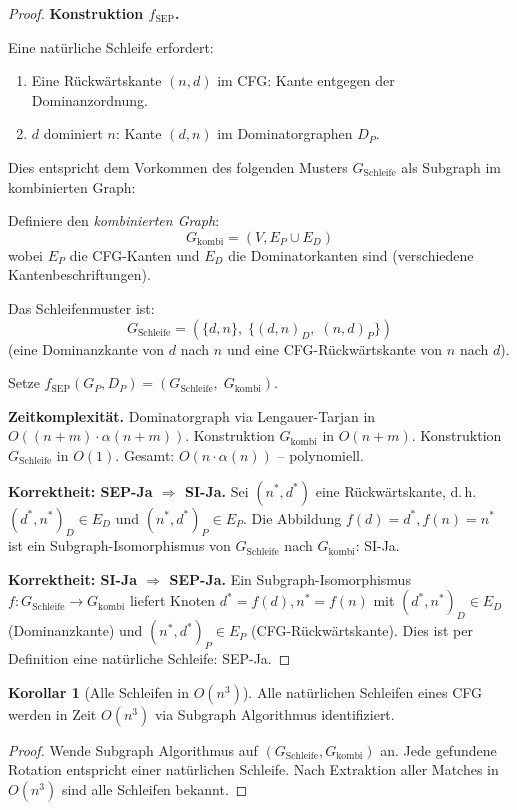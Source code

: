 ﻿\documentclass[a4paper,12pt]{article}
\theoremstyle{definition}
\newtheorem{korollar}{Korollar}
\begin{document}
\begin{proof}
\textbf{Konstruktion $f_{\text{SEP}}$.}

Eine natürliche Schleife erfordert:
\begin{enumerate}
    \item Eine Rückwärtskante $(n, d)$ im CFG: Kante entgegen der Dominanzordnung.
    \item $d$ dominiert $n$: Kante $(d, n)$ im Dominatorgraphen $D_P$.
\end{enumerate}

Dies entspricht dem Vorkommen des folgenden Musters $G_{\text{Schleife}}$ als Subgraph im kombinierten Graph:

Definiere den \emph{kombinierten Graph}:
\[
G_{\text{kombi}} = (V, E_P \cup E_D)
\]
wobei $E_P$ die CFG-Kanten und $E_D$ die Dominatorkanten sind (verschiedene Kantenbeschriftungen).

Das Schleifenmuster ist:
\[
G_{\text{Schleife}} = (\{d, n\},\; \{(d, n)_D,\; (n, d)_P\})
\]
(eine Dominanzkante von $d$ nach $n$ und eine CFG-Rückwärtskante von $n$ nach $d$).

Setze $f_{\text{SEP}}(G_P, D_P) = (G_{\text{Schleife}},\; G_{\text{kombi}})$.

\textbf{Zeitkomplexität.}
Dominatorgraph via Lengauer-Tarjan in $O((n+m) \cdot \alpha(n+m))$. Konstruktion $G_{\text{kombi}}$ in $O(n + m)$. Konstruktion $G_{\text{Schleife}}$ in $O(1)$. Gesamt: $O(n \cdot \alpha(n))$ -- polynomiell.

\textbf{Korrektheit: SEP-Ja $\Rightarrow$ SI-Ja.}
Sei $(n^*, d^*)$ eine Rückwärtskante, d.\,h.\ $(d^*, n^*)_D \in E_D$ und $(n^*, d^*)_P \in E_P$. Die Abbildung $f(d) = d^*, f(n) = n^*$ ist ein Subgraph-Isomorphismus von $G_{\text{Schleife}}$ nach $G_{\text{kombi}}$: SI-Ja.

\textbf{Korrektheit: SI-Ja $\Rightarrow$ SEP-Ja.}
Ein Subgraph-Isomorphismus $f: G_{\text{Schleife}} \to G_{\text{kombi}}$ liefert Knoten $d^* = f(d), n^* = f(n)$ mit $(d^*, n^*)_D \in E_D$ (Dominanzkante) und $(n^*, d^*)_P \in E_P$ (CFG-Rückwärtskante). Dies ist per Definition eine natürliche Schleife: SEP-Ja.
\end{proof}

\begin{korollar}[Alle Schleifen in $O(n^3)$]
Alle natürlichen Schleifen eines CFG werden in Zeit $O(n^3)$ via Subgraph Algorithmus identifiziert.
\end{korollar}

\begin{proof}
Wende Subgraph Algorithmus auf $(G_{\text{Schleife}}, G_{\text{kombi}})$ an. Jede gefundene Rotation entspricht einer natürlichen Schleife. Nach Extraktion aller Matches in $O(n^3)$ sind alle Schleifen bekannt.
\end{proof}
\end{document}
